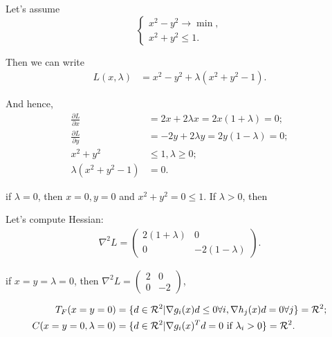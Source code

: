 \begin{eexl}
    Let's assume 
    \begin{equation*}
        \begin{cases}
            x^2 - y^2 \to \min, \\
            x^2 + y^2 \leq 1.
        \end{cases}
    \end{equation*}

    Then we can write
    \begin{equation*}
        \begin{aligned}
            L(x, \lambda) &= x^2 - y^2 + \lambda (x^2 + y^2 - 1).
        \end{aligned}
    \end{equation*}

    And hence, 
    \begin{equation*}
        \begin{aligned}
            \frac{\partial L}{\partial x} &= 2x + 2 \lambda x = 2x(1 + \lambda) = 0; \\
            \frac{\partial L}{\partial y} &= -2y + 2 \lambda y = 2y(1 - \lambda) = 0; \\ 
            x^2 + y^2 &\leq 1, \lambda \geq 0; \\ 
            \lambda (x^2 + y^2 - 1) &= 0.
        \end{aligned}
    \end{equation*}

    if $\lambda = 0$, then $x = 0, y = 0$ and $x^2 + y^2 = 0 \leq 1$. If $\lambda > 0$, then  

    Let's compute Hessian: 
    \begin{equation*}
        \begin{aligned}
            \nabla^2 L = 
            \begin{pmatrix}
                2(1 + \lambda) & 0 \\ 
                0 & -2(1 - \lambda)
            \end{pmatrix}.
        \end{aligned}
    \end{equation*}

    if $x = y = \lambda = 0$, then $\nabla^2 L = \begin{pmatrix} 2 & 0 \\ 0 & -2 \end{pmatrix}$,

    \begin{equation*}
        \begin{aligned}
            T_F (x = y = 0) &= \{d \in \mathcal{R}^2 | \nabla g_i(x) d \leq 0 \forall i, \nabla h_j(x) d = 0 \forall j\} = \mathcal{R}^2; \\ 
            C(x = y = 0, \lambda = 0) &= \{d \in \mathcal{R}^2 | \nabla g_i(x)^T d = 0 \text{ if } \lambda_i > 0\} = \mathcal{R}^2.
        \end{aligned}
    \end{equation*}


\end{eexl}

